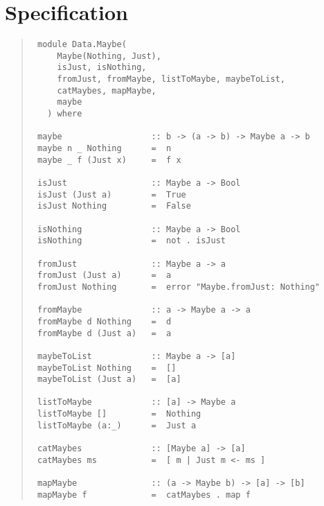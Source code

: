 \section{Specification
}
\begin{quote}
{\haddockverb\begin{verbatim}
 module Data.Maybe(
     Maybe(Nothing, Just),
     isJust, isNothing,
     fromJust, fromMaybe, listToMaybe, maybeToList,
     catMaybes, mapMaybe,
     maybe
   ) where
 
 maybe                  :: b -> (a -> b) -> Maybe a -> b
 maybe n _ Nothing      =  n
 maybe _ f (Just x)     =  f x
 
 isJust                 :: Maybe a -> Bool
 isJust (Just a)        =  True
 isJust Nothing         =  False
 
 isNothing              :: Maybe a -> Bool
 isNothing              =  not . isJust
 
 fromJust               :: Maybe a -> a
 fromJust (Just a)      =  a
 fromJust Nothing       =  error "Maybe.fromJust: Nothing"
 
 fromMaybe              :: a -> Maybe a -> a
 fromMaybe d Nothing    =  d
 fromMaybe d (Just a)   =  a
 
 maybeToList            :: Maybe a -> [a]
 maybeToList Nothing    =  []
 maybeToList (Just a)   =  [a]
 
 listToMaybe            :: [a] -> Maybe a
 listToMaybe []         =  Nothing
 listToMaybe (a:_)      =  Just a
  
 catMaybes              :: [Maybe a] -> [a]
 catMaybes ms           =  [ m | Just m <- ms ]
 
 mapMaybe               :: (a -> Maybe b) -> [a] -> [b]
 mapMaybe f             =  catMaybes . map f
\end{verbatim}}
\end{quote}
